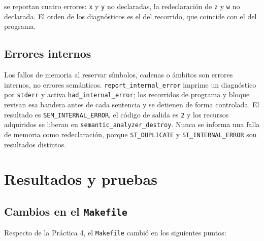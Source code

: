 \documentclass[12pt,letterpaper]{article}
\begin{document}
se reportan cuatro errores: \texttt{x} y \texttt{y} no declaradas, la redeclaración de \texttt{z} y
\texttt{w} no declarada. El orden de los diagnósticos es el del recorrido, que coincide con el del programa.

\subsection*{Errores internos}

Los fallos de memoria al reservar símbolos, cadenas o ámbitos son errores internos, no errores semánticos.
\texttt{report\_internal\_error} imprime un diagnóstico por \texttt{stderr} y activa
\texttt{had\_internal\_error}; los recorridos de programa y bloque revisan esa bandera antes de cada
sentencia y se detienen de forma controlada. El resultado es \texttt{SEM\_INTERNAL\_ERROR}, el código de
salida es \texttt{2} y los recursos adquiridos se liberan en \texttt{semantic\_analyzer\_destroy}. Nunca se
informa una falla de memoria como redeclaración, porque \texttt{ST\_DUPLICATE} y \texttt{ST\_INTERNAL\_ERROR}
son resultados distintos.

\section*{Resultados y pruebas}\label{sec:resultados}

\subsection*{Cambios en el \texttt{Makefile}}

Respecto de la Práctica 4, el \texttt{Makefile} cambió en los siguientes puntos:
\end{document}
